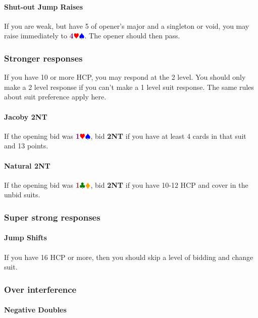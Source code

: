 \documentclass{article}
\newcommand{\Hs}{\textcolor{Red}{$\varheart$}}
\newcommand{\Ss}{\textcolor{Blue}{$\spadesuit$}}
\newcommand{\Ds}{\textcolor{Orange}{$\vardiamond$}}
\newcommand{\Cs}{\textcolor{Green}{$\clubsuit$}}
\newcommand{\NTs}{\textbf{\footnotesize{NT}}}
\newcommand{\NT}[1]{\textbf{#1\NTs}}
\newcommand{\minors}[1]{\textcolor{Brown}{\textbf{#1}}\Cs\Ds}
\newcommand{\majors}[1]{\textcolor{Purple}{\textbf{#1}}\Hs\Ss}
\begin{document}
\paragraph{Shut-out Jump Raises}

If you are weak, but have 5 of opener's major and a singleton or void, you may raise immediately to \majors{4}. The opener should then pass.

\subsubsection{Stronger responses}

If you have 10 or more HCP, you may respond at the 2 level. You should only make a 2 level response if you can't make a 1 level suit response. The same rules about suit preference apply here.

\paragraph{Jacoby \NT{2}}

If the opening bid was \majors{1}, bid \NT{2} if you have at least 4 cards in that suit and 13 points.

\paragraph{Natural \NT{2}}
If the opening bid was \minors{1}, bid \NT{2} if you have 10-12 HCP and cover in the unbid suits.

\subsubsection{Super strong responses}

\paragraph{Jump Shifts}

If you have 16 HCP or more, then you should skip a level of bidding and change suit.

\subsubsection{Over interference}

\paragraph{Negative Doubles}
\end{document}
